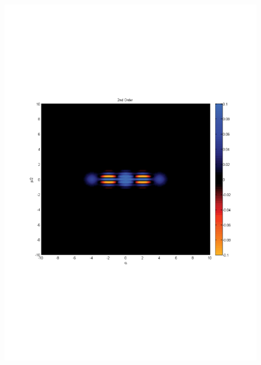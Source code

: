 \documentclass[aps,prl,twocolumn,amsmath,amssymb,nofootinbib,superscriptaddress]{revtex4}
\begin{document}
\begin{figure}[!htb]
\includegraphics[scale=0.35]{2ndOrder.pdf}\\

\end{figure}
\end{document}
